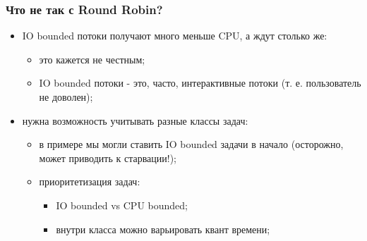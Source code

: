 \begin{frame}
\frametitle{Что не так с Round Robin?}

\begin{itemize}
  \item<1-> IO bounded потоки получают много меньше CPU, а ждут столько же:
    \begin{itemize}
      \item это кажется не честным;
      \item IO bounded потоки - это, часто, интерактивные потоки (т. е.
            пользователь не доволен);
    \end{itemize}
  \item<2-> нужна возможность учитывать разные классы задач:
    \begin{itemize}
      \item в примере мы могли ставить IO bounded задачи в начало (осторожно,
            может приводить к старвации!);
      \item приоритетизация задач:
            \begin{itemize}
              \item IO bounded vs CPU bounded;
              \item внутри класса можно варьировать квант времени;
            \end{itemize}
    \end{itemize}
\end{itemize}
\end{frame}
